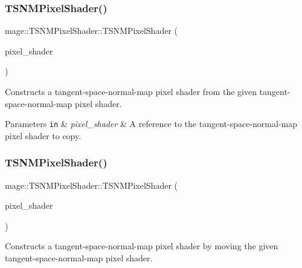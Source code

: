 \subsubsection{\texorpdfstring{T\+S\+N\+M\+Pixel\+Shader()}{TSNMPixelShader()}\hspace{0.1cm}{\footnotesize\ttfamily [5/6]}}
{\footnotesize\ttfamily mage\+::\+T\+S\+N\+M\+Pixel\+Shader\+::\+T\+S\+N\+M\+Pixel\+Shader (\begin{DoxyParamCaption}\item[{const \hyperlink{classmage_1_1_t_s_n_m_pixel_shader}{T\+S\+N\+M\+Pixel\+Shader} \&}]{pixel\+\_\+shader }\end{DoxyParamCaption})\hspace{0.3cm}{\ttfamily [delete]}}

Constructs a tangent-\/space-\/normal-\/map pixel shader from the given tangent-\/space-\/normal-\/map pixel shader.


\begin{DoxyParams}[1]{Parameters}
\mbox{\tt in}  & {\em pixel\+\_\+shader} & A reference to the tangent-\/space-\/normal-\/map pixel shader to copy. \\
\hline
\end{DoxyParams}
\hypertarget{classmage_1_1_t_s_n_m_pixel_shader_a4889850bd4ff6c3a3d22c9637752ce37}{}\label{classmage_1_1_t_s_n_m_pixel_shader_a4889850bd4ff6c3a3d22c9637752ce37} 
\subsubsection{\texorpdfstring{T\+S\+N\+M\+Pixel\+Shader()}{TSNMPixelShader()}\hspace{0.1cm}{\footnotesize\ttfamily [6/6]}}
{\footnotesize\ttfamily mage\+::\+T\+S\+N\+M\+Pixel\+Shader\+::\+T\+S\+N\+M\+Pixel\+Shader (\begin{DoxyParamCaption}\item[{\hyperlink{classmage_1_1_t_s_n_m_pixel_shader}{T\+S\+N\+M\+Pixel\+Shader} \&\&}]{pixel\+\_\+shader }\end{DoxyParamCaption})\hspace{0.3cm}{\ttfamily [default]}}

Constructs a tangent-\/space-\/normal-\/map pixel shader by moving the given tangent-\/space-\/normal-\/map pixel shader.



